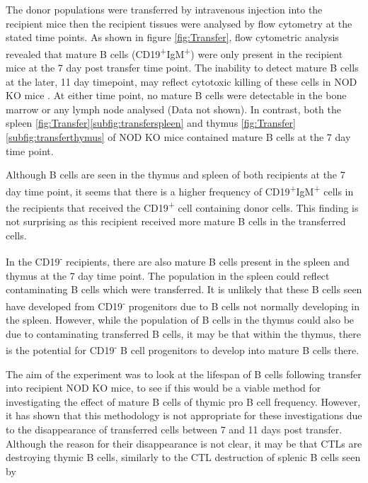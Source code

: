	
The donor populations were transferred by intravenous injection into the recipient mice then the recipient tissues were analysed by flow cytometry at the stated time points.
As shown in figure \cref{fig:Transfer}, flow cytometric analysis revealed that mature B cells (CD19\textsuperscript{+}IgM\textsuperscript{+}) were only present in the recipient mice at the 7 day post transfer time point.
The inability to detect mature B cells at the later, 11 day timepoint, may reflect cytotoxic killing of these cells in NOD KO mice \citep{Serreze1998}.
At either time point, no mature B cells were detectable in the bone marrow or any lymph node analysed (Data not shown).
In contrast, both the spleen \cref{fig:Transfer}\ref{subfig:transferspleen} and thymus \cref{fig:Transfer}\ref{subfig:transferthymus} of NOD KO mice contained mature B cells at the 7 day time point.


Although B cells are seen in the thymus and spleen of both recipients at the 7 day time point, it seems that there is a higher frequency of CD19\textsuperscript{+}IgM\textsuperscript{+} cells in the recipients that received the CD19\textsuperscript{+} cell containing donor cells.
This finding is not surprising as this recipient received more mature B cells in the transferred cells.

In the CD19\textsuperscript{-} recipients, there are also mature B cells present in the spleen and thymus at the 7 day time point.
The population in the spleen could reflect contaminating B cells which were transferred. 
It is unlikely that these B cells seen have developed from CD19\textsuperscript{-} progenitors due to B cells not normally developing in the spleen.
However, while the population of B cells in the thymus could also be due to contaminating transferred B cells, it may be that within the thymus, there is the potential for CD19\textsuperscript{-} B cell progenitors to develop into mature B cells there.


The aim of the experiment was to look at the lifespan of B cells following transfer into recipient NOD KO mice, to see if this would be a viable method for investigating the effect of mature B cells of thymic pro B cell frequency.
However, it has shown that this methodology is not appropriate for these investigations due to the disappearance of transferred cells between 7 and 11 days post transfer.
Although the reason for their disappearance is not clear, it may be that CTLs are destroying thymic B cells, similarly to the CTL destruction of splenic B cells seen by \citet{Serreze1998}

